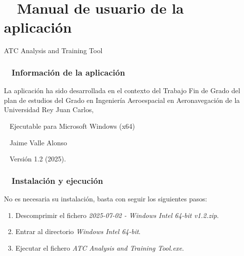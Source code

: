 \appendix

\chapter{\faBook\ \hspace{0.3cm} Manual de usuario de la aplicación}
\label{app:manual}

\vspace{-1cm}
\begin{center}
\LARGE{ATC Analysis and Training Tool}
\end{center}

\bigskip

\subsection*{\faInfoCircle\ \hspace{0.3cm} Información de la aplicación}

La aplicación ha sido desarrollada en el contexto del Trabajo Fin de Grado del plan de estudios del Grado en Ingeniería Aeroespacial en Aeronavegación de la Universidad Rey Juan Carlos, 

\begin{description}
\item \faPlay\ \hspace{0.4cm} Ejecutable para Microsoft Windows (x64)
\item \faUser\ \hspace{0.4cm} Jaime Valle Alonso
\item \faCalendar\ \hspace{0.3cm} Versión 1.2 (2025).
\end{description}



\subsection*{\faGear\ \hspace{0.3cm} Instalación y ejecución}

No es necesaria su instalación, basta con seguir los siguientes pasos:

\begin{enumerate}
\item Descomprimir el fichero \textit{2025-07-02 - Windows Intel 64-bit v1.2.zip}.

\item Entrar al directorio \textit{Windows Intel 64-bit}.

\item Ejecutar el fichero \textit{ATC Analysis and Training Tool.exe}.
\end{enumerate}


